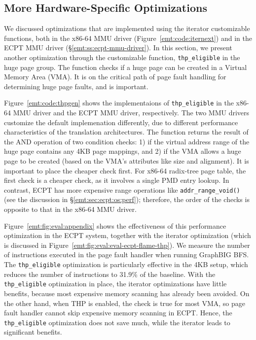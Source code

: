 \subsection{More Hardware-Specific Optimizations}
\label{emt:sec:app:another}

\noindent
We discussed optimizations that are implemented using the 
    iterator customizable functions,
    both in the x86-64 MMU driver (Figure~\ref{emt:code:iternext})
    and in the ECPT MMU driver (\S\ref{emt:ss:ecpt-mmu-driver}).
In this section, we present another optimization through the customizable function,
    \texttt{\small thp\_eligible} in the huge page group.
The function checks if a huge page can be created in a Virtual Memory Area (VMA).
It is on the critical path of page fault handling for determining huge page faults,
    and is important.

Figure~\ref{emt:code:thpgen} shows the implementaions of \texttt{\small thp\_eligible}
    in the x86-64 MMU driver and the ECPT MMU driver, respectively.
The two MMU drivers customize the default implemenation differently,
    due to different performance characteristics of the translation architectures.
The function returns the result of the AND operation of two condition checks:
1) if the virtual address range of the huge page contains any 4KB page mappings, 
and
2) if the VMA allows a huge page to be created (based on the VMA's attributes like size and alignment).
It is important to place the cheaper check first.
For x86-64 radix-tree page table, the first check is a cheaper check, 
    as it involves a single PMD entry lookup.
In contrast, ECPT has more expensive range operations like \texttt{\small addr\_range\_void()}
    (see the discussion in \S\ref{emt:sec:ecpt:os:perf});
    therefore, the order of the checks is opposite to that in 
    the x86-64 MMU driver.

Figure~\ref{emt:fig:eval:appendix} shows the effectiveness of this performance 
    optimization in the ECPT system,
    together with the iterator optimization 
    (which is discussed in Figure~\ref{emt:fig:eval:eval-ecpt-flame-thp}).
We measure the number of instructions executed in the page fault handler
	when running GraphBIG BFS.
The \texttt{\small thp\_eligible} optimization is particularly effective in the 4KB setup,
    which reduces the number of instructions to 31.9\% of the baseline.
With the \texttt{\small thp\_eligible} optimization in place, 
    the iterator optimizations have little
    benefits, because most expensive memory scanning has already been avoided.
On the other hand, when THP is enabled, the check is true for most VMA,
	so page fault handler cannot skip expensive memory scanning in ECPT.
Hence, the \texttt{\small thp\_eligible} optimization does not save 
    much, while the iterator leads to significant benefits.

